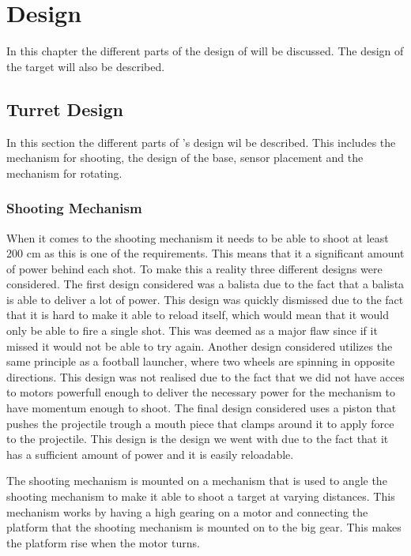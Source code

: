 \chapter{Design}
In this chapter the different parts of the design of \name will be discussed.
The design of the target will also be described.

\section{Turret Design}
In this section the different parts of \namep's design wil be described. This
includes the mechanism for shooting, the design of the base, sensor placement
and the mechanism for rotating.

\subsection{Shooting Mechanism}
When it comes to the shooting mechanism it needs to be able to shoot at least
200 cm as this is one of the requirements. This means that it a significant
amount of power behind each shot. To make this a reality three different designs
were considered. The first design considered was a balista due to the fact that
a balista is able to deliver a lot of power. This design was quickly dismissed
due to the fact that it is hard to make it able to reload itself, which would
mean that it would only be able to fire a single shot. This was deemed as a
major flaw since if it missed it would not be able to try again. Another design
considered utilizes the same principle as a football launcher, where two wheels
are spinning in opposite directions. This design was not realised due to the
fact that we did not have acces to motors powerfull enough to deliver the
necessary power for the mechanism to have momentum enough to shoot. The final
design considered uses a piston that pushes the projectile trough a mouth piece
that clamps around it to apply force to the projectile. This design is the
design we went with due to the fact that it has a sufficient amount of power and
it is easily reloadable.\nl

The shooting mechanism is mounted on a mechanism that is used to angle the
shooting mechanism to make it able to shoot a target at varying distances. This
mechanism works by having a high gearing on a motor and connecting the platform
that the shooting mechanism is mounted on to the big gear. This makes the
platform rise when the motor turns.

